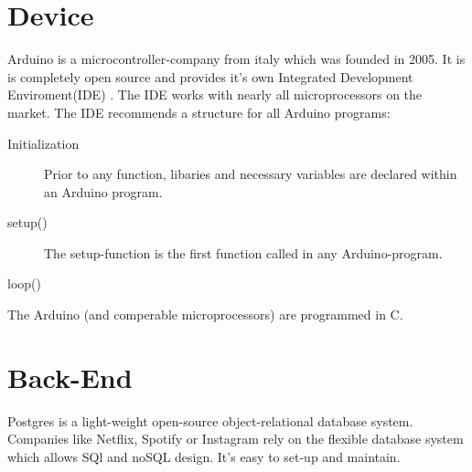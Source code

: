 \section{Device}
Arduino is a microcontroller-company from italy which was founded in 2005. 
It is is completely open source and provides it's own Integrated Development Enviroment(IDE) \parencite{arduinoIDEDownload}.
The IDE works with nearly all microprocessors on the market. 
The IDE recommends a structure for all Arduino programs:
\begin{description}
    \item [Initialization]
    Prior to any function, libaries and necessary variables are declared within an Arduino program.
    \item [setup()]
    The setup-function is the first function called in any Arduino-program.
    \item [loop()]
\end{description}
The Arduino (and comperable microprocessors) are programmed in C.
\section{Back-End}
Postgres is a light-weight open-source object-relational database system. 
Companies like Netflix, Spotify or Instagram \parencite{postgresUsers} rely on the flexible database system which allows SQl and noSQL design.
It's easy to set-up and maintain. 


